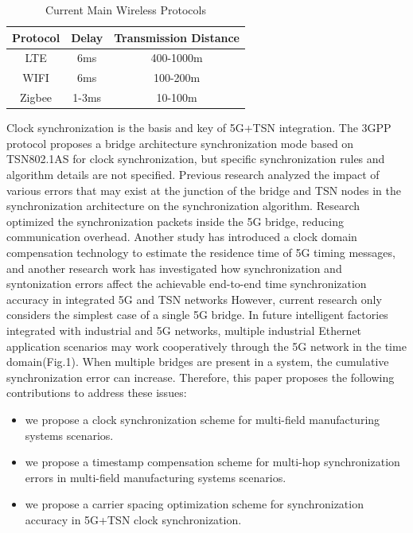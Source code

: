 \documentclass[english]{cccconf}
\begin{document}
{\begin{table}[htbp]
	\caption{Current Main Wireless Protocols}
	\begin{center}
		\begin{tabular}{|c|c|c|}
			\hline
			\textbf{Protocol}& \textbf{Delay}& \textbf{Transmission Distance} \\
			\hline
			LTE
			& 6ms
			& 400-1000m \\
			\hline
			WIFI
			& 6ms
			& 100-200m \\
			\hline
			Zigbee
			& 1-3ms
			& 10-100m \\
			\hline		
		\end{tabular}
		\label{tab1}
	\end{center}
\end{table}
Clock synchronization is the basis and key of 5G+TSN integration. The 3GPP protocol proposes a bridge architecture synchronization mode based on TSN802.1AS for clock synchronization, but specific synchronization rules and algorithm details are not specified\cite{888888}. Previous research analyzed the impact of various errors that may exist at the junction of the bridge and TSN nodes in the synchronization architecture on the synchronization algorithm\cite{9527833}. Research\cite{9211936} optimized the synchronization packets inside the 5G bridge, reducing communication overhead. Another study has introduced a clock domain compensation technology to estimate the residence time of 5G timing messages\cite{9674640}, and another research work has investigated how synchronization and syntonization errors affect the achievable end-to-end time synchronization accuracy in integrated 5G and TSN networks However, current research only considers the simplest case of a single 5G bridge\cite{9557468}. In future intelligent factories integrated with industrial and 5G networks, multiple industrial Ethernet application scenarios may work cooperatively through the 5G network in the time domain\cite{8402373}(Fig.1). When multiple bridges are present in a system, the cumulative synchronization error can increase. Therefore, this paper proposes the following contributions to address these issues:
\begin{itemize}
	\item we propose a clock synchronization scheme for multi-field manufacturing systems scenarios.
	\item we propose a timestamp compensation scheme for multi-hop synchronization errors in multi-field manufacturing systems scenarios.
	\item we propose a carrier spacing optimization scheme for synchronization accuracy in 5G+TSN clock synchronization.

\end{itemize}}
\end{document}
